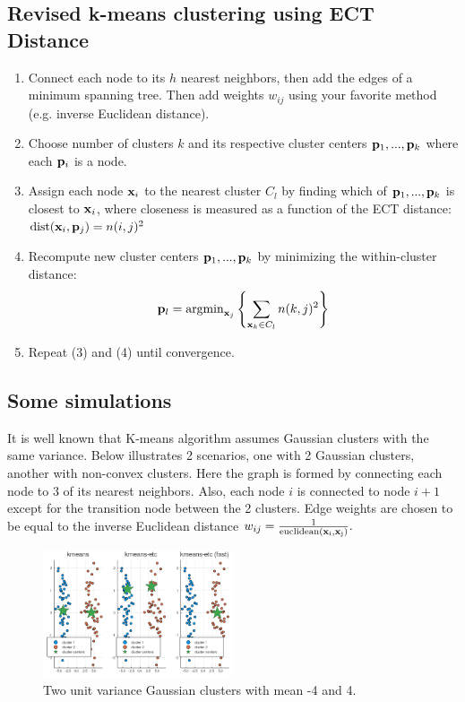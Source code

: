 \documentclass[./some_latex_template.tex]{subfiles}
\begin{document}
\subsection{Revised k-means clustering using ECT Distance}

\begin{enumerate}
	\item Connect each node to its $h$ nearest neighbors, then add the edges of a minimum spanning tree. Then add weights $w_{ij}$ using your favorite method (e.g. inverse Euclidean distance). 
	\item Choose number of clusters $k$ and its respective cluster centers $\mathbf{p}_1,...,\mathbf{p}_k$ where each $\mathbf{p}_i$ is a node.
	\item Assign each node $\mathbf{x}_i$ to the nearest cluster $C_l$ by finding which of $\mathbf{p}_1,...,\mathbf{p}_k$ is closest to $\mathbf{x}_i$, where closeness is measured as a function of the ECT distance: $\mathop{\rm dist}\nolimits(\mathbf{x}_i, \mathbf{p}_j) = n(i, j)^2$ 
	\item Recompute new cluster centers $\mathbf{p}_1,...,\mathbf{p}_k$ by minimizing the within-cluster distance:
	\begin{align*}
		\mathbf{p}_l = \mathop{\rm argmin}\nolimits_{\mathbf{x}_j} \left\{ \sum_{\mathbf{x}_k \in C_l}n(k, j)^2 \right\}
	\end{align*}
	\item Repeat (3) and (4) until convergence. 
\end{enumerate}

\subsection{Some simulations}

It is well known that K-means algorithm assumes Gaussian clusters with the same variance. Below illustrates 2 scenarios, one with 2 Gaussian clusters, another with non-convex clusters. Here the graph is formed by connecting each node to 3 of its nearest neighbors. Also, each node $i$ is connected to node $i + 1$ except for the transition node between the 2 clusters. Edge weights are chosen to be equal to the inverse Euclidean distance $w_{ij} = \frac{1}{\rm euclidean(\mathbf{x}_i, \mathbf{x}_j)}.$

\begin{figure}[H]
	\centering    
    \includegraphics[width=0.5\textwidth]{figures/convex.png}
    \caption{Two unit variance Gaussian clusters with mean -4 and 4.}
\end{figure}
\end{document}
